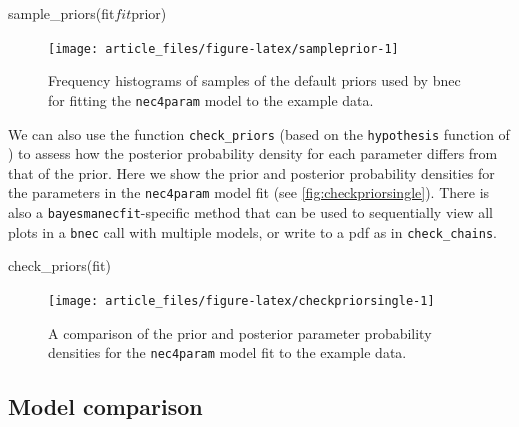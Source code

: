 \begin{Schunk}
\begin{Sinput}
sample_priors(fit$fit$prior)
\end{Sinput}
\begin{figure}[!ht]

{\centering \texttt{[image: article\_files/figure-latex/sampleprior-1]} 

}

\caption[Frequency histograms of samples of the default priors used by bnec for fitting the \texttt{nec4param} model to the example data]{Frequency histograms of samples of the default priors used by bnec for fitting the \texttt{nec4param} model to the example data.}\label{fig:sampleprior}
\end{figure}
\end{Schunk}

We can also use the function \texttt{check\_priors} (based on the
\texttt{hypothesis} function of ) to assess how the posterior
probability density for each parameter differs from that of the prior.
Here we show the prior and posterior probability densities for the
parameters in the \texttt{nec4param} model fit (see
\autoref{fig:checkpriorsingle}). There is also a
\texttt{bayesmanecfit}-specific method that can be used to sequentially
view all plots in a \texttt{bnec} call with multiple models, or write to
a pdf as in \texttt{check\_chains}.

\begin{Schunk}
\begin{Sinput}
check_priors(fit)
\end{Sinput}
\begin{figure}[!ht]

{\centering \texttt{[image: article\_files/figure-latex/checkpriorsingle-1]} 

}

\caption[A comparison of the prior and posterior parameter probability densities for the \texttt{nec4param} model fit to the example data]{A comparison of the prior and posterior parameter probability densities for the \texttt{nec4param} model fit to the example data.}\label{fig:checkpriorsingle}
\end{figure}
\end{Schunk}

\hypertarget{model-comparison}{%
\subsection{Model comparison}\label{model-comparison}}

